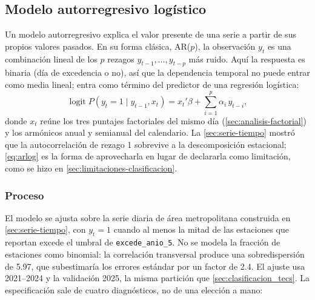 \subsection{Modelo autorregresivo logístico}\label{sec:autorregresivo}

Un modelo autorregresivo explica el valor presente de una serie a partir de
sus propios valores pasados. En su forma clásica, AR($p$), la observación
$y_t$ es una combinación lineal de los $p$ rezagos $y_{t-1},\dots,y_{t-p}$
más ruido. Aquí la respuesta es binaria (día de excedencia o no), así que la
dependencia temporal no puede entrar como media lineal; entra como término
del predictor de una regresión logística:
\begin{equation}
  \operatorname{logit} P(y_t = 1 \mid y_{t-1}, x_t)
    = x_t'\beta + \sum_{i=1}^{p} \alpha_i\, y_{t-i},
  \label{eq:arlog}
\end{equation}
donde $x_t$ reúne los tres puntajes factoriales del mismo día
(\cref{sec:analisis-factorial}) y los armónicos anual y semianual del
calendario. La \cref{sec:serie-tiempo} mostró que la autocorrelación de
rezago 1 sobrevive a la descomposición estacional; \cref{eq:arlog} es la
forma de aprovecharla en lugar de declararla como limitación, como se hizo en
\cref{sec:limitaciones-clasificacion}.

\subsubsection{Proceso}

El modelo se ajusta sobre la serie diaria de área metropolitana construida en
\cref{sec:serie-tiempo}, con $y_t = 1$ cuando al menos la mitad de las
estaciones que reportan excede el umbral de \texttt{excede\_anio\_5}. No se
modela la fracción de estaciones como binomial: la correlación transversal
produce una sobredispersión de 5.97, que subestimaría los errores estándar
por un factor de 2.4. El ajuste usa 2021--2024 y la validación 2025, la misma
partición que \cref{sec:clasificacion_tecs}. La especificación sale de cuatro
diagnósticos, no de una elección a mano:

